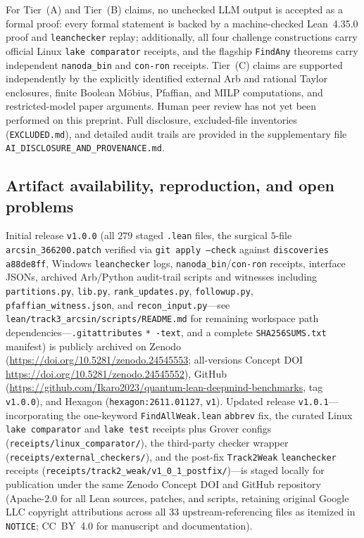 \documentclass[11pt,a4paper]{article}
\theoremstyle{definition}
\theoremstyle{remark}
\begin{document}
For Tier~(A) and Tier~(B) claims, no unchecked LLM output is accepted as a formal proof: every formal statement is backed by a machine-checked Lean~4.35.0 proof and \texttt{lean\allowbreak checker} replay; additionally, all four challenge constructions carry official Linux \texttt{lake comparator} receipts, and the flagship \texttt{FindAny} theorems carry independent \texttt{nanoda\_bin} and \texttt{con-ron} receipts. Tier~(C) claims are supported independently by the explicitly identified external Arb and rational Taylor enclosures, finite Boolean M\"obius, Pfaffian, and MILP computations, and restricted-model paper arguments. Human peer review has not yet been performed on this preprint. Full disclosure, excluded-file inventories (\texttt{EXCLUDED.md}), and detailed audit trails are provided in the supplementary file \texttt{AI\_DISCLOSURE\_AND\_PROVENANCE.md}.

\subsection{Artifact availability, reproduction, and open problems}

Initial release \texttt{v1.0.0} (all \(279\) staged \texttt{.lean} files, the surgical \(5\)-file \texttt{arcsin\_\allowbreak 366200.patch} verified via \texttt{git apply --check} against \texttt{discoveries} \texttt{a88de8ff}, Windows \texttt{leanchecker} logs, \texttt{nanoda\_\allowbreak bin}/\texttt{con-ron} receipts, interface JSONs, archived Arb/Python audit-trail scripts and witnesses including \texttt{partitions.py}, \texttt{lib.py}, \texttt{rank\_\allowbreak updates.py}, \texttt{followup.py}, \texttt{pfaffian\_\allowbreak witness.\allowbreak json}, and \texttt{recon\_\allowbreak input.py}---see \texttt{lean/\allowbreak track3\_\allowbreak arcsin/\allowbreak scripts/\allowbreak README.md} for remaining workspace path dependencies---\texttt{.git\allowbreak attributes} \texttt{* -text}, and a complete \texttt{SHA256\allowbreak SUMS.txt} manifest) is publicly archived on Zenodo (\url{https://doi.org/10.5281/zenodo.24545553}; all-versions Concept DOI \url{https://doi.org/10.5281/zenodo.24545552}), GitHub (\url{https://github.com/Ikaro2023/quantum-lean-deepmind-benchmarks}, tag \texttt{v1.0.0}), and Hexagon (\texttt{hexagon:2611.01127}, \texttt{v1}). Updated release \texttt{v1.0.1}---incorporating the one-keyword \texttt{FindAll\allowbreak Weak.lean} \texttt{abbrev} fix, the curated Linux \texttt{lake comparator} and \texttt{lake test} receipts plus Grover configs (\texttt{receipts/\allowbreak linux\_\allowbreak comparator/}), the third-party checker wrapper (\texttt{receipts/\allowbreak external\_\allowbreak checkers/}), and the post-fix \texttt{Track2\allowbreak Weak} \texttt{leanchecker} receipts (\texttt{receipts/\allowbreak track2\_\allowbreak weak/\allowbreak v1\_0\_1\_\allowbreak postfix/})---is staged locally for publication under the same Zenodo Concept DOI and GitHub repository (Apache-2.0 for all Lean sources, patches, and scripts, retaining original Google LLC copyright attributions across all \(33\) upstream-referencing files as itemized in \texttt{NOTICE}; CC~BY~4.0 for manuscript and documentation).
\end{document}

